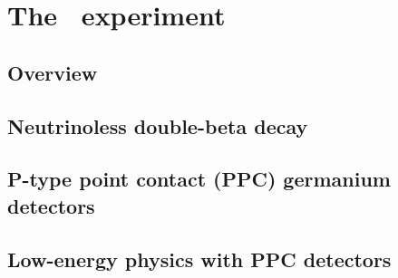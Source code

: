 
\chapter{The \MJ\ experiment}
	\label{chap:IntroChapter}

	\section{Overview}

	\section{Neutrinoless double-beta decay}
	
	\section{P-type point contact (PPC) germanium detectors}

	\section{Low-energy physics with PPC detectors}
